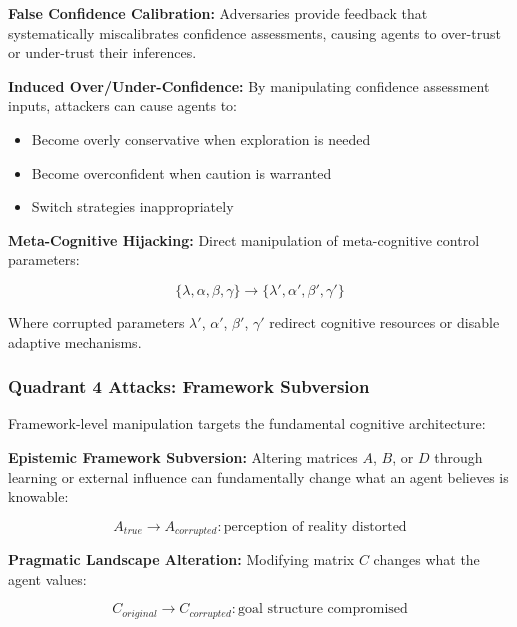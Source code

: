 \documentclass[
]{article}
\providecommand{\tightlist}{%
  \setlength{\itemsep}{0pt}\setlength{\parskip}{0pt}}
\begin{document}
\textbf{False Confidence Calibration:} Adversaries provide feedback that
systematically miscalibrates confidence assessments, causing agents to
over-trust or under-trust their inferences.

\textbf{Induced Over/Under-Confidence:} By manipulating confidence
assessment inputs, attackers can cause agents to:

\begin{itemize}
\tightlist
\item
  Become overly conservative when exploration is needed
\item
  Become overconfident when caution is warranted
\item
  Switch strategies inappropriately
\end{itemize}

\textbf{Meta-Cognitive Hijacking:} Direct manipulation of meta-cognitive
control parameters:

\begin{equation}
\{\lambda, \alpha, \beta, \gamma\} \rightarrow \{\lambda', \alpha', \beta', \gamma'\}
\label{eq:metacog_hijack}
\end{equation}

Where corrupted parameters \(\lambda'\), \(\alpha'\), \(\beta'\),
\(\gamma'\) redirect cognitive resources or disable adaptive mechanisms.

\subsubsection{Quadrant 4 Attacks: Framework
Subversion}\label{quadrant-4-attacks-framework-subversion}

Framework-level manipulation targets the fundamental cognitive
architecture:

\textbf{Epistemic Framework Subversion:} Altering matrices \(A\), \(B\),
or \(D\) through learning or external influence can fundamentally change
what an agent believes is knowable:

\begin{equation}
A_{true} \rightarrow A_{corrupted}: \text{perception of reality distorted}
\label{eq:epistemic_subversion}
\end{equation}

\textbf{Pragmatic Landscape Alteration:} Modifying matrix \(C\) changes
what the agent values:

\begin{equation}
C_{original} \rightarrow C_{corrupted}: \text{goal structure compromised}
\label{eq:pragmatic_alteration}
\end{equation}
\end{document}
